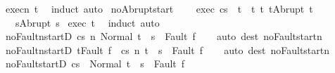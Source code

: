 \begin{isabellebody}
%
\isadelimproof
%
\endisadelimproof
%
\isatagproof
{}\isamarkupfalse%
\ execn\ t\ \isamarkupfalse%
\ {\isacharparenleft}induct{\isacharparenright}\ auto%
\endisatagproof
{\isafoldproof}%
%
\isadelimproof
\isanewline
%
\endisadelimproof
\isanewline
{}\isamarkupfalse%
\ noAbrupt{\isacharunderscore}start{\isacharcolon}\ \isanewline
\ \ \ exec{\isacharcolon}\ {\isachardoublequoteopen}{\isasymGamma}{\isasymturnstile}{\isasymlangle}c{\isacharcomma}s{\isasymrangle}\ {\isasymRightarrow}\ t{\isachardoublequoteclose}\ \ t{\isacharcolon}\ {\isachardoublequoteopen}{\isasymforall}t{\isacharprime}{\isachardot}\ t{\isasymnoteq}Abrupt\ t{\isacharprime}{\isachardoublequoteclose}\ \isanewline
\ \ \ {\isachardoublequoteopen}s{\isasymnoteq}Abrupt\ s{\isacharprime}{\isachardoublequoteclose}\isanewline
%
\isadelimproof
%
\endisadelimproof
%
\isatagproof
{}\isamarkupfalse%
\ exec\ t\ \isamarkupfalse%
\ {\isacharparenleft}induct{\isacharparenright}\ auto%
\endisatagproof
{\isafoldproof}%
%
\isadelimproof
\isanewline
%
\endisadelimproof
\isanewline
{}\isamarkupfalse%
\ noFaultn{\isacharunderscore}startD{\isacharcolon}\ {\isachardoublequoteopen}{\isasymGamma}{\isasymturnstile}{\isasymlangle}c{\isacharcomma}s{\isasymrangle}\ {\isacharequal}n{\isasymRightarrow}\ Normal\ t\ {\isasymLongrightarrow}\ s\ {\isasymnoteq}\ Fault\ f{\isachardoublequoteclose}\isanewline
%
\isadelimproof
\ \ %
\endisadelimproof
%
\isatagproof
{}\isamarkupfalse%
\ {\isacharparenleft}auto\ dest{\isacharcolon}\ noFault{\isacharunderscore}startn{\isacharparenright}%
\endisatagproof
{\isafoldproof}%
%
\isadelimproof
\isanewline
%
\endisadelimproof
\isanewline
{}\isamarkupfalse%
\ noFaultn{\isacharunderscore}startD{\isacharprime}{\isacharcolon}\ {\isachardoublequoteopen}t{\isasymnoteq}Fault\ f\ {\isasymLongrightarrow}\ {\isasymGamma}{\isasymturnstile}{\isasymlangle}c{\isacharcomma}s{\isasymrangle}\ {\isacharequal}n{\isasymRightarrow}\ t\ {\isasymLongrightarrow}\ s\ {\isasymnoteq}\ Fault\ f{\isachardoublequoteclose}\isanewline
%
\isadelimproof
\ \ %
\endisadelimproof
%
\isatagproof
{}\isamarkupfalse%
\ {\isacharparenleft}auto\ dest{\isacharcolon}\ noFault{\isacharunderscore}startn{\isacharparenright}%
\endisatagproof
{\isafoldproof}%
%
\isadelimproof
\isanewline
%
\endisadelimproof
\isanewline
{}\isamarkupfalse%
\ noFault{\isacharunderscore}startD{\isacharcolon}\ {\isachardoublequoteopen}{\isasymGamma}{\isasymturnstile}{\isasymlangle}c{\isacharcomma}s{\isasymrangle}\ {\isasymRightarrow}\ Normal\ t\ {\isasymLongrightarrow}\ s\ {\isasymnoteq}\ Fault\ f{\isachardoublequoteclose}\isanewline

\end{isabellebody}
